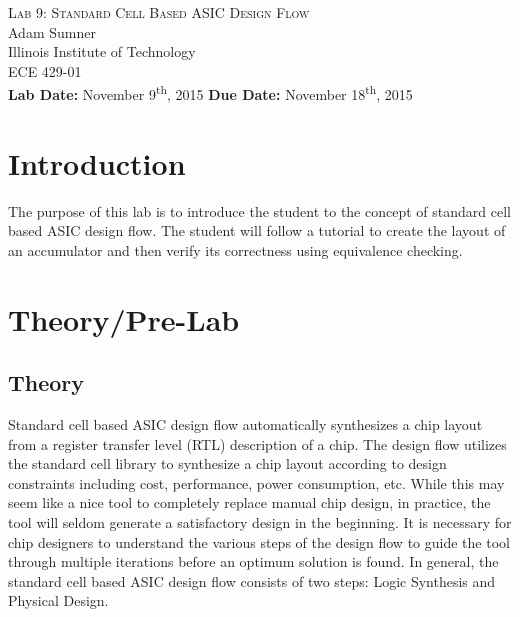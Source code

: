\documentclass[12pt]{article}
\begin{document}
\begin{titlepage}
	\begin{center}
		
		
		\vfill
		
		\textsc{\LARGE Lab 9: Standard Cell Based ASIC Design Flow}\\[1.5cm]
		
		\Large Adam Sumner\\[0.5cm]
		
		\Large Illinois Institute of Technology\\[0.5cm]
		
		\Large ECE 429-01\\[0.5cm]	
		
		\noindent
		\vfill
		\large \textbf{Lab Date:} November 9\textsuperscript{th}, 2015\hfill
		\large \textbf{Due Date:} November 18\textsuperscript{th}, 2015
	
		
	\end{center}
\end{titlepage}

\section{Introduction}
The purpose of this lab is to introduce the student to the concept of standard cell based ASIC design flow. The student will follow a tutorial to create the layout of an accumulator and then verify its correctness using equivalence checking.
\section{Theory/Pre-Lab}
\subsection{Theory}
Standard cell based ASIC design flow automatically synthesizes a chip layout from a register transfer level (RTL) description of a chip. The design flow utilizes the standard cell library to synthesize a chip layout according to design constraints including cost, performance, power consumption, etc. While this may seem like a nice tool to completely replace manual chip design, in practice, the tool will seldom generate a satisfactory design in the beginning. It is necessary for chip designers to understand the various steps of the design flow to guide the tool through multiple iterations before an optimum solution is found. In general, the standard cell based ASIC design flow consists of two steps: Logic Synthesis and Physical Design.
\end{document}
